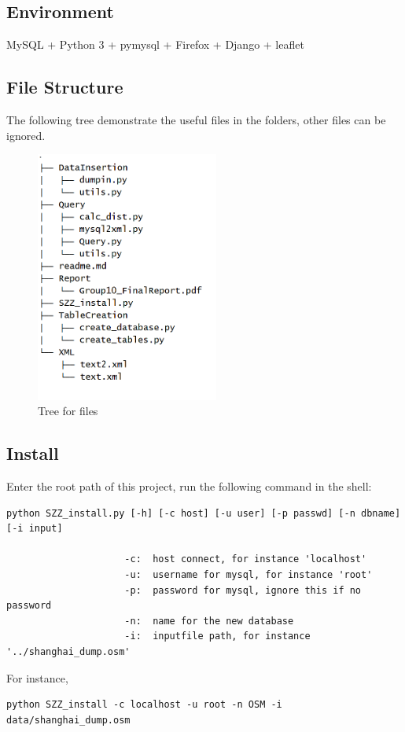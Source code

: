 \documentclass[final,1p,times]{elsarticle}
\begin{document}
\subsection{Environment}
MySQL + Python 3 + pymysql + Firefox + Django + leaflet
\subsection{File Structure}
The following tree demonstrate the useful files in the folders, other files can be ignored.
\begin{figure}[thpb]
      \centering
      \includegraphics[width=6cm]{tree.png}
      \caption{Tree for files}
      \label{fig:tree}
\end{figure}
\subsection{Install}
Enter the root path of this project, run the following command in the shell:
\begin{verbatim}
python SZZ_install.py [-h] [-c host] [-u user] [-p passwd] [-n dbname] [-i input]

                     -c:  host connect, for instance 'localhost'
                     -u:  username for mysql, for instance 'root'
                     -p:  password for mysql, ignore this if no password
                     -n:  name for the new database
                     -i:  inputfile path, for instance '../shanghai_dump.osm'
\end{verbatim}
For instance,

\begin{verbatim}
python SZZ_install -c localhost -u root -n OSM -i data/shanghai_dump.osm
\end{verbatim}
\end{document}
